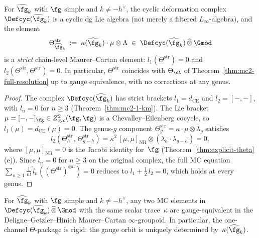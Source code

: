 \begin{theorem}\label{thm:km-strictification}
For $\widehat{\fg}_k$ with $\fg$ simple and $k \neq -h^\vee$,
the cyclic deformation complex $\Defcyc(\widehat{\fg}_k)$ is a
cyclic dg Lie algebra \textup{(}not merely a filtered
$L_\infty$-algebra\textup{)}, and the element
\begin{equation}\label{eq:theta-strict}
\Theta^{\mathrm{str}}_{\widehat{\fg}_k}
\;:=\;
\kappa(\widehat{\fg}_k) \cdot \mu \otimes \Lambda
\;\in\;
\Defcyc(\widehat{\fg}_k) \,\widehat{\otimes}\, \Gmod
\end{equation}
is a \emph{strict} chain-level Maurer--Cartan element:
$l_1(\Theta^{\mathrm{str}}) = 0$ and
$l_2(\Theta^{\mathrm{str}}, \Theta^{\mathrm{str}}) = 0$.
In particular, $\Theta^{\mathrm{str}}$ coincides with
$\Theta_{\cA}$ of
Theorem~\textup{\ref{thm:mc2-full-resolution}} up to gauge
equivalence, with no corrections at any genus.
\end{theorem}

\begin{proof}
The complex $\Defcyc(\widehat{\fg}_k)$
has strict brackets
$l_1 = d_{\mathrm{CE}}$ and $l_2 = [-,-]$, with
$l_n = 0$ for $n \geq 3$
(Theorem~\ref{thm:mc2-1-km}).
The Lie bracket
$\mu = [-,-]_\fg \in Z^2_{\mathrm{cyc}}(\fg,\fg)$
is a Chevalley--Eilenberg cocycle, so
$l_1(\mu) = d_{\mathrm{CE}}(\mu) = 0$.
The genus-$g$ component
$\Theta^{\mathrm{str}}_g = \kappa \cdot \mu \otimes
\lambda_g$ satisfies
\[
l_2(\Theta^{\mathrm{str}}_h,\,\Theta^{\mathrm{str}}_{g-h})
= \kappa^2\,[\mu,\mu]_{\mathrm{NR}}
  \otimes (\lambda_h \cdot \lambda_{g-h})
= 0,
\]
where $[\mu,\mu]_{\mathrm{NR}} = 0$ is the Jacobi identity
for~$\fg$
(Theorem~\ref{thm:explicit-theta}(e)).
Since $l_n = 0$ for $n \geq 3$ on the original complex,
the full MC equation
$\sum_{n \geq 1} \frac{1}{n!}\,
\hat{l}_n((\Theta^{\mathrm{str}})^{\otimes n}) = 0$
reduces to $l_1 + \frac{1}{2}\,l_2 = 0$, which holds at
every genus.
\end{proof}

\begin{proposition}\label{prop:one-channel-gauge-rigidity}
For $\widehat{\fg}_k$ with $\fg$ simple and $k \neq -h^\vee$,
any two MC elements in
$\Defcyc(\widehat{\fg}_k) \,\widehat{\otimes}\, \Gmod$ with the
same scalar trace~$\kappa$ are gauge-equivalent in the
Deligne--Getzler--Hinich Maurer--Cartan $\infty$-groupoid.
In particular, the one-channel $\Theta$-package is rigid:
the gauge orbit is uniquely determined
by~$\kappa(\widehat{\fg}_k)$.
\end{proposition}

